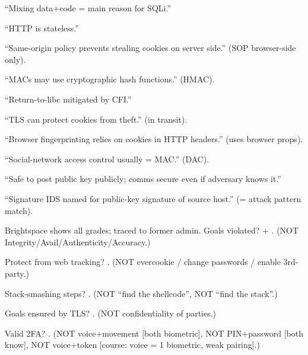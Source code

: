 {\fivept
{}
 ``Mixing data+code = main reason for SQLi.'' \par
{} ``HTTP is stateless.'' \par
{} ``Same-origin policy prevents stealing cookies on server side.''  (SOP browser-side only).\par
{} ``MACs may use cryptographic hash functions.''  (HMAC).\par
{} ``Return-to-libc mitigated by CFI.'' \par
{} ``TLS can protect cookies from theft.''  (in transit).\par
{} ``Browser fingerprinting relies on cookies in HTTP headers.''  (uses browser props).\par
{} ``Social-network access control usually = MAC.''  (DAC).\par
{} ``Safe to post public key publicly; comms secure even if adversary knows it.'' \par
{} ``Signature IDS named for public-key signature of source host.''  (= attack pattern match).\par

 Brightspace shows all grades; traced to former admin. Goals violated?  + . (NOT Integrity/Avail/Authenticity/Accuracy.)\par
{} Protect from web tracking?   . (NOT evercookie / change passwords / enable 3rd-party.)\par
{} Stack-smashing steps?     . (NOT ``find the shellcode'', NOT ``find the stack''.)\par
{} Goals ensured by TLS?    . (NOT confidentiality of parties.)\par
{} Valid 2FA?  . (NOT voice+movement [both biometric], NOT PIN+password [both know], NOT voice+token [course: voice = 1 biometric, weak pairing].)\par

}
